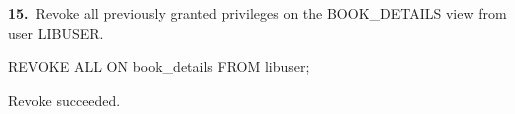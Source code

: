 \noindent\begin{minipage}{\linewidth}
\begingroup{}
{\fontsize{14}{17}\selectfont\textbf{15.}}\ Revoke all previously granted privileges on the BOOK\_DETAILS view from user LIBUSER.\par
\endgroup\vspace{12pt}


\begin{sqlcode}
REVOKE ALL ON book_details FROM libuser;
\end{sqlcode}

\vspace{18pt}


\begin{sqlout}[fontsize=\small]
Revoke succeeded.
\end{sqlout}
\end{minipage}\par\vspace{24pt}

